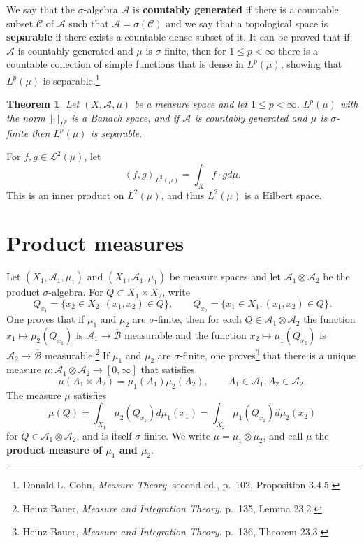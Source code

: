 \documentclass{article}
\newcommand{\inner}[2]{\left\langle #1, #2 \right\rangle}
\newcommand{\norm}[1]{\left\Vert #1 \right\Vert}
\newtheorem{theorem}{Theorem}
\theoremstyle{definition}
\begin{document}
We say that the $\sigma$-algebra $\mathscr{A}$ is \textbf{countably generated} if there is a countable subset $\mathscr{C}$ of $\mathscr{A}$
such that $\mathscr{A}=\sigma(\mathscr{C})$ and we say that a topological space is \textbf{separable} if there exists a countable dense subset of it.
It can be proved that
if $\mathscr{A}$ is countably generated and $\mu$ is $\sigma$-finite, 
then for $1 \leq p < \infty$ there is a countable collection of simple functions that is dense in 
$L^p(\mu)$, showing that $L^p(\mu)$ is separable.\footnote{Donald L. Cohn,
{\em Measure Theory}, second ed., p.~102, Proposition 3.4.5.}

\begin{theorem}
Let $(X,\mathscr{A},\mu)$ be a measure space and let $1 \leq p < \infty$. $L^p(\mu)$ with the norm $\norm{\cdot}_{L^p}$ is a Banach space, and if $\mathscr{A}$ is countably generated
and $\mu$ is $\sigma$-finite then $L^p(\mu)$ is separable. 
\end{theorem}

For $f,g \in \mathscr{L}^2(\mu)$, let
\[
\inner{f}{g}_{L^2(\mu)} = \int_X f \cdot \overline{g} d\mu.
\]
This is an inner product on $L^2(\mu)$, and thus $L^2(\mu)$ is a Hilbert space. 


\section{Product measures}
Let $(X_1,\mathscr{A}_1,\mu_1)$ and $(X_1,\mathscr{A}_1,\mu_1)$ be measure spaces and let
$\mathscr{A}_1 \otimes \mathscr{A}_2$ be the product $\sigma$-algebra.
For $Q \subset X_1 \times X_2$, write
\[
Q_{x_1} = \{x_2 \in X_2: (x_1,x_2) \in Q\},
\qquad Q_{x_2} = \{x_1 \in X_1: (x_1,x_2) \in Q\}.
\]
One proves that if $\mu_1$ and $\mu_2$ are $\sigma$-finite, then
for each $Q \in \mathscr{A}_1 \otimes \mathscr{A}_2$ the function
$x_1 \mapsto \mu_2(Q_{x_1})$ is $\mathscr{A}_1 \to \overline{\mathscr{B}}$ measurable
and the function $x_2 \mapsto \mu_1(Q_{x_2})$ is $\mathscr{A}_2 \to \overline{\mathscr{B}}$ measurable.\footnote{Heinz Bauer,
{\em Measure and Integration Theory}, p.~135, Lemma 23.2.}
If $\mu_1$ and $\mu_2$ are $\sigma$-finite, one proves\footnote{Heinz Bauer,
{\em Measure and Integration Theory}, p.~136, Theorem 23.3.}  that
there is a unique measure 
$\mu:\mathscr{A}_1 \otimes \mathscr{A}_2 \to [0,\infty]$ that satisfies
\[
\mu(A_1 \times A_2) = \mu_1(A_1) \mu_2(A_2),\qquad A_1 \in \mathscr{A}_1, A_2 \in \mathscr{A}_2.
\]
The measure $\mu$ satisfies
\[
\mu(Q) = \int_{X_1} \mu_2(Q_{x_1}) d\mu_1(x_1) = \int_{X_2} \mu_1(Q_{x_2}) d\mu_2(x_2)
\]
for $Q \in \mathscr{A}_1 \otimes \mathscr{A}_2$,
and is itself $\sigma$-finite.
We write $\mu=\mu_1 \otimes \mu_2$, and call $\mu$ the \textbf{product measure of $\mu_1$ and $\mu_2$}.
\end{document}
